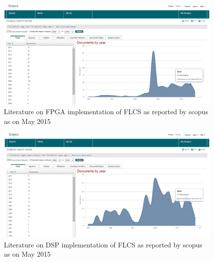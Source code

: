 \begin{figure}[t!]
	\centering
	\includegraphics[width=1\linewidth]{Chapter1/chapter1/Fig2_FPGA_trend}
	\caption{Literature on FPGA implementation of FLCS as reported by scopus as on May 2015}
	\label{fig:Fig2_FPGA}
\end{figure}
\begin{figure}[t!]
	\centering
	\includegraphics[width=1\linewidth]{Chapter1/chapter1/Fig3_DSP_trend}
	\caption{Literature on DSP implementation of FLCS as reported by scopus as on May 2015}
	\label{fig:Fig3_DSP}
\end{figure}

